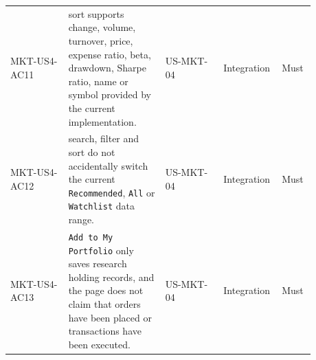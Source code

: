 \begin{longtable}{L{0.18\linewidth}L{0.30\linewidth}L{0.18\linewidth}L{0.12\linewidth}L{0.10\linewidth}}
MKT-US4-AC11 & sort supports change, volume, turnover, price, expense ratio, beta, drawdown, Sharpe ratio, name or symbol provided by the current implementation. & US-MKT-04 & Integration & Must \\
MKT-US4-AC12 & search, filter and sort do not accidentally switch the current \texttt{Recommended}, \texttt{All} or \texttt{Watchlist} data range. & US-MKT-04 & Integration & Must \\
MKT-US4-AC13 & \texttt{Add to My Portfolio} only saves research holding records, and the page does not claim that orders have been placed or transactions have been executed. & US-MKT-04 & Integration & Must \\
\bottomrule
\end{longtable}
\endgroup
